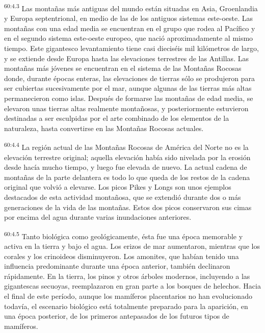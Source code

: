 \par
\textsuperscript{60:4.3} Las montañas más antiguas del mundo están situadas en Asia, Groenlandia y Europa septentrional, en medio de las de los antiguos sistemas este-oeste. Las montañas con una edad media se encuentran en el grupo que rodea al Pacífico y en el segundo sistema este-oeste europeo, que nació aproximadamente al mismo tiempo. Este gigantesco levantamiento tiene casi dieciséis mil kilómetros de largo, y se extiende desde Europa hasta las elevaciones terrestres de las Antillas. Las montañas más jóvenes se encuentran en el sistema de las Montañas Rocosas donde, durante épocas enteras, las elevaciones de tierras sólo se produjeron para ser cubiertas sucesivamente por el mar, aunque algunas de las tierras más altas permanecieron como islas. Después de formarse las montañas de edad media, se elevaron unas tierras altas realmente montañosas, y posteriormente estuvieron destinadas a ser esculpidas por el arte combinado de los elementos de la naturaleza, hasta convertirse en las Montañas Rocosas actuales.

\par
\textsuperscript{60:4.4} La región actual de las Montañas Rocosas de América del Norte no es la elevación terrestre original; aquella elevación había sido nivelada por la erosión desde hacía mucho tiempo, y luego fue elevada de nuevo. La actual cadena de montañas de la parte delantera es todo lo que queda de los restos de la cadena original que volvió a elevarse. Los picos Pikes y Longs son unos ejemplos destacados de esta actividad montañosa, que se extendió durante dos o más generaciones de la vida de las montañas. Estos dos picos conservaron sus cimas por encima del agua durante varias inundaciones anteriores.

\par
\textsuperscript{60:4.5} Tanto biológica como geológicamente, ésta fue una época memorable y activa en la tierra y bajo el agua. Los erizos de mar aumentaron, mientras que los corales y los crinoideos disminuyeron. Los amonites, que habían tenido una influencia predominante durante una época anterior, también declinaron rápidamente. En la tierra, los pinos y otros árboles modernos, incluyendo a las gigantescas secuoyas, reemplazaron en gran parte a los bosques de helechos. Hacia el final de este período, aunque los mamíferos placentarios no han evolucionado todavía, el escenario biológico está totalmente preparado para la aparición, en una época posterior, de los primeros antepasados de los futuros tipos de mamíferos.

